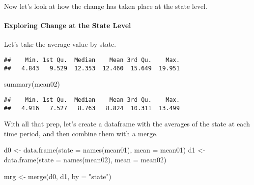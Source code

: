 \documentclass[
]{article}
\newenvironment{Shaded}{\begin{snugshade}}{\end{snugshade}}
\newcommand{\AttributeTok}[1]{\textcolor[rgb]{0.77,0.63,0.00}{#1}}
\newcommand{\FunctionTok}[1]{\textcolor[rgb]{0.00,0.00,0.00}{#1}}
\newcommand{\NormalTok}[1]{#1}
\newcommand{\OtherTok}[1]{\textcolor[rgb]{0.56,0.35,0.01}{#1}}
\newcommand{\SpecialCharTok}[1]{\textcolor[rgb]{0.00,0.00,0.00}{#1}}
\newcommand{\StringTok}[1]{\textcolor[rgb]{0.31,0.60,0.02}{#1}}
\begin{document}
Now let's look at how the change has taken place at the state level.

\hypertarget{exploring-change-at-the-state-level}{%
\paragraph{Exploring Change at the State
Level}\label{exploring-change-at-the-state-level}}

Let's take the average value by state.

\begin{Shaded}
\end{Shaded}

\begin{verbatim}
##    Min. 1st Qu.  Median    Mean 3rd Qu.    Max. 
##   4.843   9.529  12.353  12.460  15.649  19.951
\end{verbatim}

\begin{Shaded}
\begin{Highlighting}[]
\FunctionTok{summary}\NormalTok{(mean02)}
\end{Highlighting}
\end{Shaded}

\begin{verbatim}
##    Min. 1st Qu.  Median    Mean 3rd Qu.    Max. 
##   4.916   7.527   8.763   8.824  10.311  13.499
\end{verbatim}

With all that prep, let's create a dataframe with the averages of the
state at each time period, and then combine them with a merge.

\begin{Shaded}
\begin{Highlighting}[]
\NormalTok{d0 }\OtherTok{\textless{}{-}} \FunctionTok{data.frame}\NormalTok{(}\AttributeTok{state =} \FunctionTok{names}\NormalTok{(mean01), }\AttributeTok{mean =}\NormalTok{ mean01)}
\NormalTok{d1 }\OtherTok{\textless{}{-}} \FunctionTok{data.frame}\NormalTok{(}\AttributeTok{state =} \FunctionTok{names}\NormalTok{(mean02), }\AttributeTok{mean =}\NormalTok{ mean02)}

\NormalTok{mrg }\OtherTok{\textless{}{-}} \FunctionTok{merge}\NormalTok{(d0, d1, }\AttributeTok{by =} \StringTok{"state"}\NormalTok{)}
\end{Highlighting}
\end{Shaded}
\end{document}
